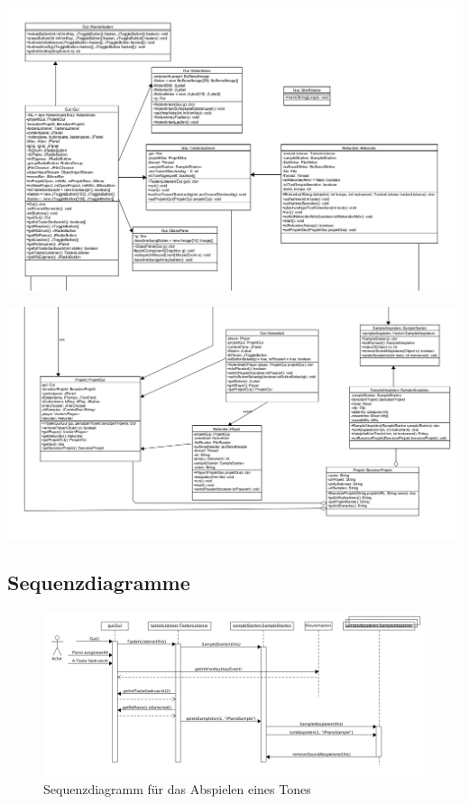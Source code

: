 {\centering
\includegraphics[scale=0.5]{Bilder/GUIKlassendia/TeilOben.PNG} 

\medskip
\includegraphics[scale=0.5]{Bilder/GUIKlassendia/TeilUnten.PNG} 

}

\newpage

\newpage

\subsection{Sequenzdiagramme}


\begin{figure}[h]
 \centering
 \includegraphics[width=1\textwidth]{./Bilder/Klaviertaste_Gedrueckt.png}
 \caption{Sequenzdiagramm für das Abspielen eines Tones}
\end{figure}

